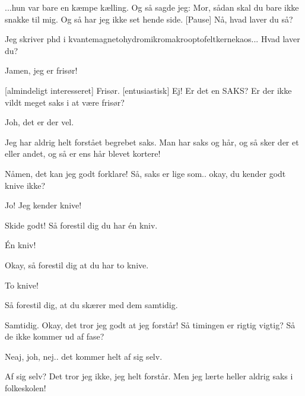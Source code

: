 \documentclass[a4paper,11pt]{article}
\begin{document}
\begin{sketch}




 ...hun var bare en kæmpe kælling. Og så sagde jeg: Mor, sådan skal du bare ikke snakke til mig. Og så har jeg ikke set hende side. [Pause] Nå, hvad laver du så?

 Jeg skriver phd i
kvantemagnetohydromikromakrooptofeltkernekaos... Hvad laver du?

 Jamen, jeg er frisør!

 [almindeligt interesseret] Frisør.  [entusiastisk] Ej! Er det en SAKS? Er der ikke vildt meget saks i at være frisør?

 Joh, det er der vel.

 Jeg har aldrig helt forstået begrebet saks. Man har saks og hår, og så
sker der et eller andet, og så er ens hår blevet kortere!

 Nåmen, det kan jeg godt forklare! Så, saks er lige som.. okay, du
kender godt knive ikke?

 Jo! Jeg kender knive!

 Skide godt! Så forestil dig du har én kniv. 

 Én kniv! 

 Okay, så forestil dig at du har to knive.

 To knive! 

 Så forestil dig, at du skærer med dem samtidig.

  Samtidig. Okay, det tror jeg godt at jeg forstår! Så timingen er rigtig vigtig? Så de ikke kommer ud af fase? 

  Neaj, joh, nej.. det kommer helt af sig selv.

  Af sig selv? Det tror jeg ikke, jeg helt
forstår. Men jeg lærte heller aldrig saks i folkeskolen!



\end{sketch}
\end{document}
